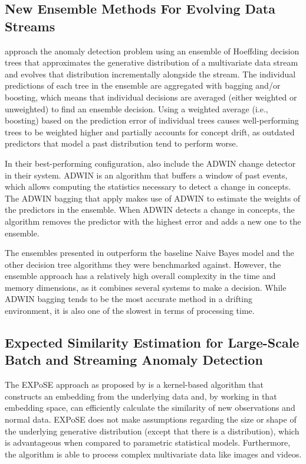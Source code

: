 \subsection{New Ensemble Methods For Evolving Data Streams \citep{bifet_new_2009}}
\citet{bifet_new_2009} approach the anomaly detection problem using an ensemble of Hoeffding decision trees that approximates the generative distribution of a multivariate data stream and evolves that distribution incrementally alongside the stream. The individual predictions of each tree in the ensemble are aggregated with bagging and/or boosting, which means that individual decisions are averaged (either weighted or unweighted) to find an ensemble decision. Using a weighted average (i.e., boosting) based on the prediction error of individual trees causes well-performing trees to be weighted higher and partially accounts for concept drift, as outdated predictors that model a past distribution tend to perform worse.

In their best-performing configuration, \citet{bifet_new_2009} also include the ADWIN change detector in their system. ADWIN is an algorithm that buffers a window of past events, which allows computing the statistics necessary to detect a change in concepts. The ADWIN bagging that \citet{bifet_new_2009} apply makes use of ADWIN to estimate the weights of the predictors in the ensemble. When ADWIN detects a change in concepts, the algorithm removes the predictor with the highest error and adds a new one to the ensemble.

The ensembles presented in \citet{bifet_new_2009} outperform the baseline Naive Bayes model and the other decision tree algorithms they were benchmarked against. However, the ensemble approach has a relatively high overall complexity in the time and memory dimensions, as it combines several systems to make a decision. While ADWIN bagging tends to be the most accurate method in a drifting environment, it is also one of the slowest in terms of processing time.


\subsection{Expected Similarity Estimation for Large-Scale Batch and Streaming Anomaly Detection \citep{schneider_expected_2016}}
The EXPoSE approach as proposed by \citet{schneider_expected_2016} is a kernel-based algorithm that constructs an embedding from the underlying data and, by working in that embedding space, can efficiently calculate the similarity of new observations and normal data. EXPoSE does not make assumptions regarding the size or shape of the underlying generative distribution (except that there is a distribution), which is advantageous when compared to parametric statistical models. Furthermore, the algorithm is able to process complex multivariate data like images and videos.

